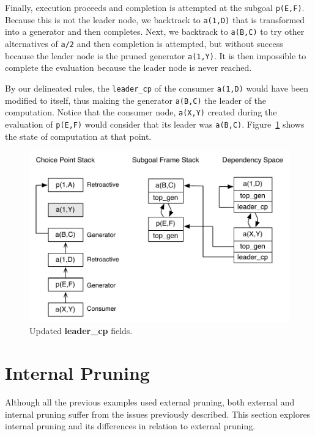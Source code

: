 Finally, execution proceeds and completion is attempted at the subgoal \texttt{p(E,F)}.
Because this is not the leader node, we backtrack to \texttt{a(1,D)} that is transformed
into a generator and then completes. Next, we backtrack to \texttt{a(B,C)} to try other
alternatives of \texttt{a/2} and then completion is attempted, but without success because
the leader node is the pruned generator \texttt{a(1,Y)}. It is then impossible to complete
the evaluation because the leader node is never reached.

By our delineated rules, the \texttt{leader\_cp} of the consumer \texttt{a(1,D)} would have been
modified to itself, thus making the generator \texttt{a(B,C)} the leader of the computation.
Notice that the consumer node, \texttt{a(X,Y)} created during the evaluation of \texttt{p(E,F)} would
consider that its leader was \texttt{a(B,C)}. Figure~\ref{fig:retro_leader_recomputation2} shows the
state of computation at that point.

\begin{figure}[ht]
  \centering
    \includegraphics[scale=0.6]{retro_leader_recomputation2.pdf}
  \caption{Updated \textbf{leader\_cp} fields.}
  \label{fig:retro_leader_recomputation2}
\end{figure}

\section{Internal Pruning}

Although all the previous examples used external pruning, both external and internal pruning
suffer from the issues previously described. This section explores internal pruning
and its differences in relation to external pruning.

